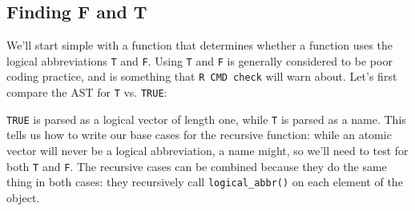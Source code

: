 \subsection{Finding F and T}

We'll start simple with a function that determines whether a function
uses the logical abbreviations \texttt{T} and \texttt{F}. Using
\texttt{T} and \texttt{F} is generally considered to be poor coding
practice, and is something that \texttt{R CMD check} will warn about.
Let's first compare the AST for \texttt{T} vs. \texttt{TRUE}:

\begin{Shaded}
\begin{Highlighting}[]
\NormalTok{(}\NormalTok{)}
\end{Highlighting}
\end{Shaded}

\texttt{TRUE} is parsed as a logical vector of length one, while
\texttt{T} is parsed as a name. This tells us how to write our base
cases for the recursive function: while an atomic vector will never be a
logical abbreviation, a name might, so we'll need to test for both
\texttt{T} and \texttt{F}. The recursive cases can be combined because
they do the same thing in both cases: they recursively call
\texttt{logical\_abbr()} on each element of the object.

